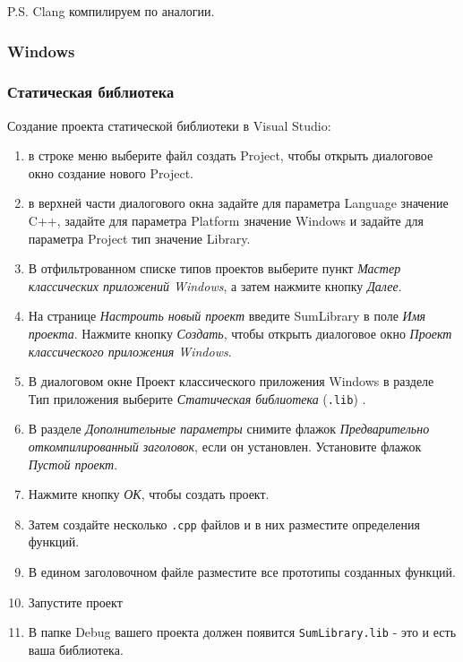P.S. Clang компилируем по аналогии.

\subsubsection{Windows}

\subsubsection*{Статическая библиотека}

Создание проекта статической библиотеки в Visual Studio:
\begin{enumerate}
    \item
          в строке меню выберите файл создать Project, чтобы открыть диалоговое окно создание нового Project.
    \item
          в верхней части диалогового окна задайте для параметра Language значение C++, задайте для параметра Platform значение Windows и задайте для параметра Project тип значение Library.
    \item
          В отфильтрованном списке типов проектов выберите пункт \textit{Мастер классических приложений Windows}, а затем нажмите кнопку \textit{Далее}.
    \item
          На странице \textit{Настроить новый проект} введите SumLibrary в поле \textit{Имя проекта}. Нажмите кнопку \textit{Создать}, чтобы открыть диалоговое окно \textit{Проект классического приложения Windows}.
    \item
          В диалоговом окне Проект классического приложения Windows в разделе Тип приложения выберите \textit{Статическая библиотека} (\texttt{.lib}) .
    \item
          В разделе \textit{Дополнительные параметры} снимите флажок \textit{Предварительно откомпилированный заголовок}, если он установлен. Установите флажок \textit{Пустой проект}.
    \item
          Нажмите кнопку \textit{ОК}, чтобы создать проект.
    \item
          Затем создайте несколько \texttt{.cpp} файлов и в них разместите определения функций.
    \item
          В едином заголовочном файле разместите все прототипы созданных функций.
    \item
          Запустите проект
    \item
          В папке Debug вашего проекта должен появится \texttt{SumLibrary.lib} - это и есть ваша библиотека.
\end{enumerate}

